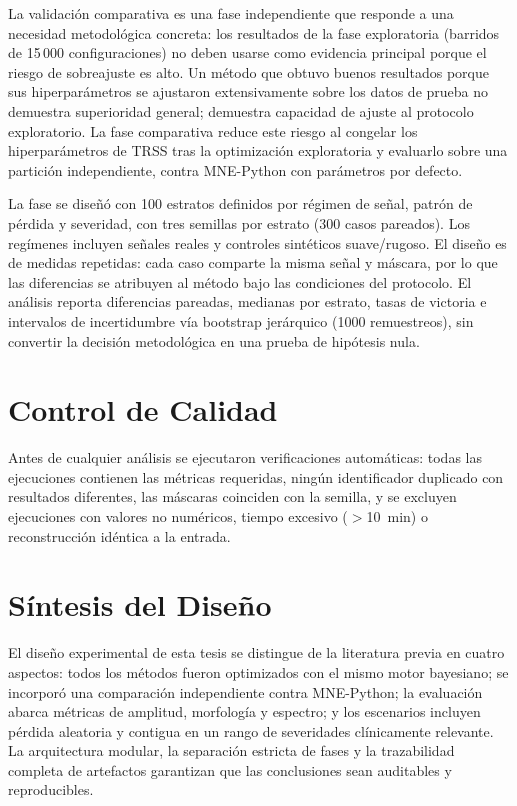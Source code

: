 La validación comparativa es una fase independiente que responde a una necesidad metodológica concreta: los resultados de la fase exploratoria (barridos de 15\,000 configuraciones) no deben usarse como evidencia principal porque el riesgo de sobreajuste es alto. Un método que obtuvo buenos resultados porque sus hiperparámetros se ajustaron extensivamente sobre los datos de prueba no demuestra superioridad general; demuestra capacidad de ajuste al protocolo exploratorio. La fase comparativa reduce este riesgo al congelar los hiperparámetros de TRSS tras la optimización exploratoria y evaluarlo sobre una partición independiente, contra MNE-Python con parámetros por defecto.

La fase se diseñó con 100 estratos definidos por régimen de señal, patrón de pérdida y severidad, con tres semillas por estrato (300 casos pareados). Los regímenes incluyen señales reales y controles sintéticos suave/rugoso. El diseño es de medidas repetidas: cada caso comparte la misma señal y máscara, por lo que las diferencias se atribuyen al método bajo las condiciones del protocolo. El análisis reporta diferencias pareadas, medianas por estrato, tasas de victoria e intervalos de incertidumbre vía bootstrap jerárquico (1000 remuestreos), sin convertir la decisión metodológica en una prueba de hipótesis nula.

\section{Control de Calidad}

Antes de cualquier análisis se ejecutaron verificaciones automáticas: todas las ejecuciones contienen las métricas requeridas, ningún identificador duplicado con resultados diferentes, las máscaras coinciden con la semilla, y se excluyen ejecuciones con valores no numéricos, tiempo excesivo ($>$10~min) o reconstrucción idéntica a la entrada.

\section{Síntesis del Diseño}

El diseño experimental de esta tesis se distingue de la literatura previa en cuatro aspectos: todos los métodos fueron optimizados con el mismo motor bayesiano; se incorporó una comparación independiente contra MNE-Python; la evaluación abarca métricas de amplitud, morfología y espectro; y los escenarios incluyen pérdida aleatoria y contigua en un rango de severidades clínicamente relevante. La arquitectura modular, la separación estricta de fases y la trazabilidad completa de artefactos garantizan que las conclusiones sean auditables y reproducibles.